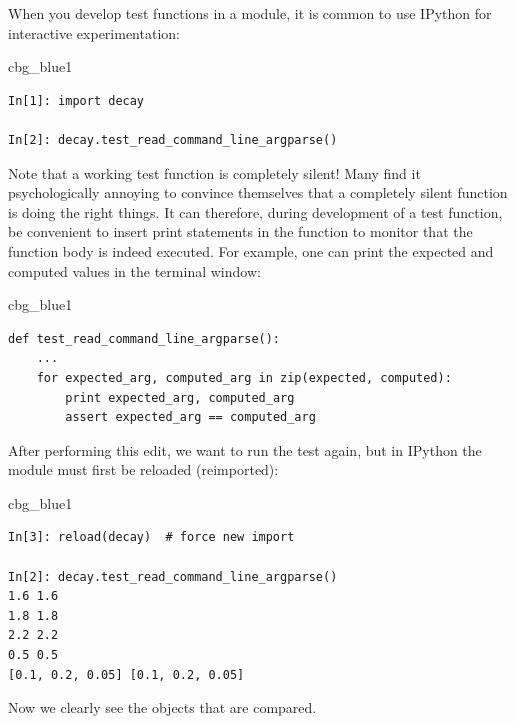 \documentclass[%
oneside,                 %
final,                   %
10pt]{article}
\newenvironment{_cod_tight}[1]{
   \def\FrameCommand{\colorbox{#1}}
   \FrameRule0.6pt\MakeFramed {\FrameRestore}\vskip3mm}
   {\vskip0mm\endMakeFramed}
\newenvironment{cod}[1]{
\bgroup\rmfamily
\fboxsep=0mm\relax
\begin{_cod_tight}{#1}
\list{}{\parsep=-2mm\parskip=0mm\topsep=0pt\leftmargin=2mm
\rightmargin=2\leftmargin\leftmargin=4pt\relax}
\item\relax}
{\endlist\end{_cod_tight}\egroup}
\newenvironment{warning_mdfboxadmon}[1][]{
\begin{warning_mdfboxmdframed}[frametitle=#1]
}
{
\end{warning_mdfboxmdframed}
}
\begin{document}
\begin{warning_mdfboxadmon}
When you develop test functions in a module, it is common to use IPython
for interactive experimentation:

\begin{cod}{cbg_blue1}\begin{Verbatim}[numbers=none,fontsize=\fontsize{9pt}{9pt},baselinestretch=0.95,xleftmargin=2mm]
In[1]: import decay

In[2]: decay.test_read_command_line_argparse()
\end{Verbatim}
\end{cod}
\noindent

Note that a working test function is completely silent! Many
find it psychologically annoying to convince themselves that a
completely silent function is doing the right things. It can therefore,
during development of a test function, be convenient to insert
print statements in the function to monitor that the function body
is indeed executed. For example, one can print the expected and
computed values in the terminal window:

\begin{cod}{cbg_blue1}\begin{Verbatim}[numbers=none,fontsize=\fontsize{9pt}{9pt},baselinestretch=0.95,xleftmargin=2mm]
def test_read_command_line_argparse():
    ...
    for expected_arg, computed_arg in zip(expected, computed):
        print expected_arg, computed_arg
        assert expected_arg == computed_arg
\end{Verbatim}
\end{cod}
\noindent
After performing this edit, we want to run the test again, but
in IPython the module must first be reloaded (reimported):

\begin{cod}{cbg_blue1}\begin{Verbatim}[numbers=none,fontsize=\fontsize{9pt}{9pt},baselinestretch=0.95,xleftmargin=2mm]
In[3]: reload(decay)  # force new import

In[2]: decay.test_read_command_line_argparse()
1.6 1.6
1.8 1.8
2.2 2.2
0.5 0.5
[0.1, 0.2, 0.05] [0.1, 0.2, 0.05]
\end{Verbatim}
\end{cod}
\noindent
Now we clearly see the objects that are compared.
\end{warning_mdfboxadmon}
\end{document}
